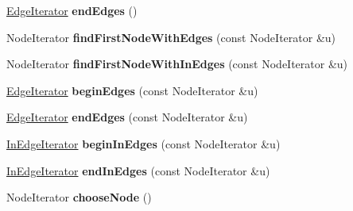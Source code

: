 \begin{DoxyCompactItemize}
\item 
\hypertarget{class_packed_memory_array_impl_aa587edef412d5be5542b7b69a1f2faaa}{
\hyperlink{class_packed_memory_array_1_1_iterator}{EdgeIterator} {\bfseries endEdges} ()}
\label{class_packed_memory_array_impl_aa587edef412d5be5542b7b69a1f2faaa}

\item 
\hypertarget{class_packed_memory_array_impl_aeb7d8be80c5c1b4ebdf27ac81647c285}{
NodeIterator {\bfseries findFirstNodeWithEdges} (const NodeIterator \&u)}
\label{class_packed_memory_array_impl_aeb7d8be80c5c1b4ebdf27ac81647c285}

\item 
\hypertarget{class_packed_memory_array_impl_ada8cd241ced1c2bc5599b8259c92aa5f}{
NodeIterator {\bfseries findFirstNodeWithInEdges} (const NodeIterator \&u)}
\label{class_packed_memory_array_impl_ada8cd241ced1c2bc5599b8259c92aa5f}

\item 
\hypertarget{class_packed_memory_array_impl_ac3b49a80de43cab0c622d9ec596b12e7}{
\hyperlink{class_packed_memory_array_1_1_iterator}{EdgeIterator} {\bfseries beginEdges} (const NodeIterator \&u)}
\label{class_packed_memory_array_impl_ac3b49a80de43cab0c622d9ec596b12e7}

\item 
\hypertarget{class_packed_memory_array_impl_a43e57d8a0d583e31178bff8efb41bd62}{
\hyperlink{class_packed_memory_array_1_1_iterator}{EdgeIterator} {\bfseries endEdges} (const NodeIterator \&u)}
\label{class_packed_memory_array_impl_a43e57d8a0d583e31178bff8efb41bd62}

\item 
\hypertarget{class_packed_memory_array_impl_a3666ba6740e383b260499e62eb4ffc28}{
\hyperlink{class_packed_memory_array_1_1_iterator}{InEdgeIterator} {\bfseries beginInEdges} (const NodeIterator \&u)}
\label{class_packed_memory_array_impl_a3666ba6740e383b260499e62eb4ffc28}

\item 
\hypertarget{class_packed_memory_array_impl_a579e2a3111d35867af90af9aa0f9c841}{
\hyperlink{class_packed_memory_array_1_1_iterator}{InEdgeIterator} {\bfseries endInEdges} (const NodeIterator \&u)}
\label{class_packed_memory_array_impl_a579e2a3111d35867af90af9aa0f9c841}

\item 
\hypertarget{class_packed_memory_array_impl_ab00bf7a3fffb30b3c4f1f18762ad0add}{
NodeIterator {\bfseries chooseNode} ()}
\label{class_packed_memory_array_impl_ab00bf7a3fffb30b3c4f1f18762ad0add}


\end{DoxyCompactItemize}
